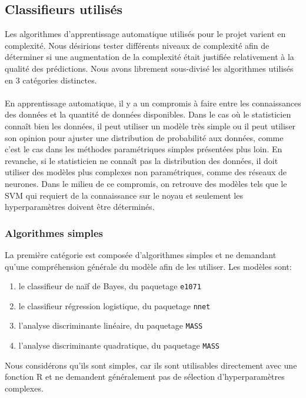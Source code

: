 \subsection{Classifieurs utilisés}
Les algorithmes d'apprentissage automatique utilisés pour le projet varient en complexité. Nous désirions tester différents niveaux de complexité afin de déterminer si une augmentation de la complexité était justifiée relativement à la qualité des prédictions. Nous avons librement sous-divisé les algorithmes utilisés en 3 catégories distinctes. \\ \\
En apprentissage automatique, il y a un compromis à faire entre les connaissances des données et la quantité de données disponibles. Dans le cas où le statisticien connaît bien les données, il peut utiliser un modèle très simple ou il peut utiliser son opinion pour ajuster une distribution de probabilité aux données, comme c'est le cas dans les méthodes paramétriques simples présentées plus loin. En revanche, si le statisticien ne connaît pas la distribution des données, il doit utiliser des modèles plus complexes non paramétriques, comme des réseaux de neurones. Dans le milieu de ce compromis, on retrouve des modèles tels que le SVM qui requiert de la connaissance sur le noyau et seulement les hyperparamètres doivent être déterminés.

\subsubsection{Algorithmes simples}
La première catégorie est composée d'algorithmes simples et ne demandant qu'une compréhension générale du modèle afin de les utiliser. Les modèles sont:

\begin{enumerate}
  \item le classifieur de naïf de Bayes, du paquetage \texttt{e1071} \cite{packagee1071}
  \item le classifieur régression logistique, du paquetage \texttt{nnet} \cite{packagennet} 
  \item l'analyse discriminante linéaire, du paquetage \texttt{MASS} \cite{packageMASS}
  \item l'analyse discriminante quadratique, du paquetage \texttt{MASS}  \cite{packageMASS}
\end{enumerate}

Nous considérons qu'ils sont simples, car ils sont utilisables directement avec une fonction R et ne demandent généralement pas de sélection d'hyperparamètres complexes.

